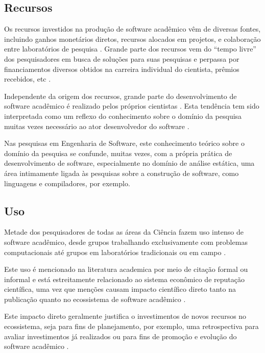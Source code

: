\subsection{Recursos}

Os recursos investidos na produção de software acadêmico vêm de diversas
fontes, incluindo ganhos monetários diretos, recursos alocados em projetos, e
colaboração entre laboratórios de pesquisa \cite{howison2015understanding}.
Grande parte dos recursos vem do ``tempo livre'' dos pesquisadores em busca de
soluções para suas pesquisas e perpassa por financiamentos diversos obtidos na
carreira individual do cientista, prêmios recebidos, etc
\cite{howison2015understanding}.

Independente da origem dos recursos, grande parte do desenvolvimento de
software acadêmico é realizado pelos próprios cientistas \cite{hettrick2014uk,
momcheva2015software}.
Esta tendência tem sido interpretada como um reflexo do conhecimento sobre o
domínio da pesquisa muitas vezes necessário ao ator desenvolvedor do software
\cite{segal2008developing}.

Nas pesquisas em Engenharia de Software, este conhecimento teórico sobre o
domínio da pesquisa se confunde, muitas vezes, com a própria prática de
desenvolvimento de software, especialmente no domínio de análise estática, uma
área intimamente ligada às pesquisas sobre a construção de software,
como linguagens e compiladores, por exemplo.

\subsection{Uso}

Metade dos pesquisadores de todas as áreas da Ciência fazem uso intenso de
software acadêmico, desde grupos trabalhando exclusivamente com problemas
computacionais até grupos em laboratórios tradicionais ou em campo
\cite{wilson2014best}.

Este uso é mencionado na literatura academica por meio de citação formal ou informal
\cite{smith2016software} e está estreitamente relacionado ao sistema
econômico de reputação científica, uma vez que
menções causam
impacto científico direto tanto na publicação quanto no ecossistema de software
acadêmico \cite{katz2014transitive}.

Este impacto direto geralmente justifica o investimentos de novos recursos no
ecossistema, seja para fins de planejamento, por exemplo, uma retrospectiva para avaliar
investimentos já realizados ou para fins de promoção e evolução do software acadêmico
\cite{howison2015understanding}.


